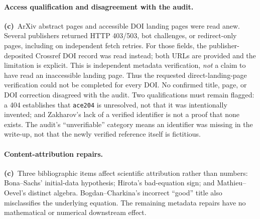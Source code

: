 \documentclass[11pt,a4paper]{article}
\newcommand{\C}{\textbf{(c)}\ }
\newcommand{\file}[1]{\nolinkurl{#1}}
\begin{document}
\paragraph{Access qualification and disagreement with the audit.}
\C ArXiv abstract pages and accessible DOI landing pages were read anew.
Several publishers returned HTTP 403/503, bot challenges, or redirect-only
pages, including on independent fetch retries. For those fields, the
publisher-deposited Crossref DOI record was read instead; both URLs are
provided and the limitation is explicit. This is independent metadata
verification, \emph{not} a claim to have read an inaccessible landing page.
Thus the requested direct-landing-page verification could not be completed
for every DOI. No confirmed title, page, or DOI correction disagreed with the
audit. Two qualifications must remain flagged: a 404 establishes that
\file{ace204} is unresolved, not that it was intentionally invented; and
Zakharov's lack of a verified identifier is not a proof that none exists.
The audit's ``unverifiable'' category means an identifier was missing in the
write-up, not that the newly verified reference itself is fictitious.

\paragraph{Content-attribution repairs.}
\C Three bibliographic items affect scientific attribution rather than
numbers: Bona--Sachs' initial-data hypothesis; Hirota's bad-equation sign;
and Mathieu--Oevel's distinct algebra. Bogdan--Charkina's incorrect
``good'' title also misclassifies the underlying equation. The remaining
metadata repairs have no mathematical or numerical downstream effect.
\end{document}
